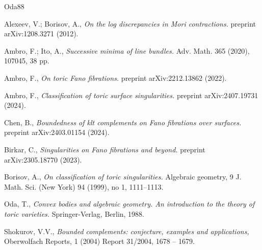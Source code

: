 \documentclass[12pt,twoside]{amsart}
\theoremstyle{plain}
\theoremstyle{definition}
\theoremstyle{remark}
\begin{document}

\begin{thebibliography}{Oda88}


Alexeev, V.; Borisov, A.,
{\em On the log discrepancies in Mori contractions.}
{preprint  arXiv:1208.3271 (2012).}

Ambro, F.; Ito, A.,
{\em Successive minima of line bundles.}
{Adv. Math. 365 (2020), 107045, 38 pp.}

Ambro, F.,
{\em On toric Fano fibrations.}
{preprint arXiv:2212.13862 (2022).}

Ambro, F.,
{\em Classification of toric surface singularities.}
{preprint arXiv:2407.19731 (2024).}

Chen, B.,
{\em Boundedness of klt complements on Fano fibrations over surfaces.}
{preprint arXiv:2403.01154 (2024).}

Birkar, C.,
{\em Singularities on Fano fibrations and beyond.}
{preprint arXiv:2305.18770 (2023).}

Borisov, A.,
{\em On classification of toric singularities.}
{Algebraic geometry, 9 J. Math. Sci. (New York)
	94 (1999), no 1, 1111--1113.}
	
Oda, T.,
{\em Convex bodies and algebraic geometry. 
	An introduction to the theory of toric varieties.}
{Springer-Verlag, Berlin, 1988.}

Shokurov, V.V.,
{\em Bounded complements: conjecture, examples and applications,}
{Oberwolfach Reports, 1 (2004) Report 31/2004, 1678 -- 1679.}


\end{thebibliography}
\end{document}
